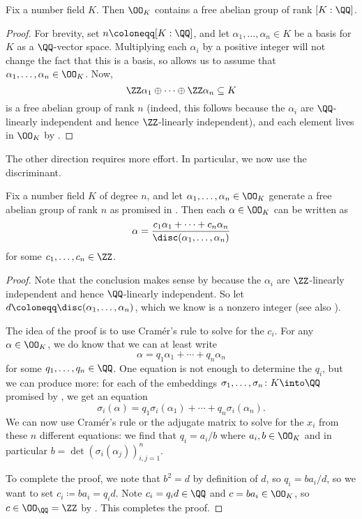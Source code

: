 \documentclass[../notes.tex]{subfiles}
\begin{document}
\begin{corollary} \label{cor:o-k-contains-rank-n}
	Fix a number field $K$. Then $\OO_K$ contains a free abelian group of rank $[K:\QQ]$.
\end{corollary}
\begin{proof}
	For brevity, set $n\coloneqq[K:\QQ]$, and let $\alpha_1,\ldots,\alpha_n\in K$ be a basis for $K$ as a $\QQ$-vector space. Multiplying each $\alpha_i$ by a positive integer will not change the fact that this is a basis, so  allows us to assume that $\alpha_1,\ldots,\alpha_n\in\OO_K$. Now,
	\[\ZZ\alpha_1\oplus\cdots\oplus\ZZ\alpha_n\subseteq K\]
	is a free abelian group of rank $n$ (indeed, this follows because the $\alpha_i$ are $\QQ$-linearly independent and hence $\ZZ$-linearly independent), and each element lives in $\OO_K$ by .
\end{proof}
The other direction requires more effort. In particular, we now use the discriminant.
\begin{lemma} \label{lem:bound-denom-o-k}
	Fix a number field $K$ of degree $n$, and let $\alpha_1,\ldots,\alpha_n\in\OO_K$ generate a free abelian group of rank $n$ as promised in . Then each $\alpha\in\OO_K$ can be written as
	\[\alpha=\frac{c_1\alpha_1+\cdots+c_n\alpha_n}{\disc(\alpha_1,\ldots,\alpha_n)}\]
	for some $c_1,\ldots,c_n\in\ZZ$.
\end{lemma}
\begin{proof}
	Note that the conclusion makes sense by  because the $\alpha_i$ are $\ZZ$-linearly independent and hence $\QQ$-linearly independent. So let $d\coloneqq\disc(\alpha_1,\ldots,\alpha_n)$, which we know is a nonzero integer (see also ).

	The idea of the proof is to use Cram\'er's rule to solve for the $c_i$. For any $\alpha\in\OO_K$, we do know that we can at least write
	\[\alpha=q_1\alpha_1+\cdots+q_n\alpha_n\]
	for some $q_1,\ldots,q_n\in\QQ$. One equation is not enough to determine the $q_i$, but we can produce more: for each of the embeddings $\sigma_1,\ldots,\sigma_n\colon K\into\QQ$ promised by , we get an equation
	\[\sigma_i(\alpha)=q_1\sigma_i(\alpha_1)+\cdots+q_n\sigma_i(\alpha_n).\]
	We can now use Cram\'er's rule or the adjugate matrix to solve for the $x_i$ from these $n$ different equations: we find that $q_i=a_i/b$ where $a_i,b\in\OO_K$ and in particular $b=\det(\sigma_i(\alpha_j))_{i,j=1}^n$.

	To complete the proof, we note that $b^2=d$ by definition of $d$, so $q_i=ba_i/d$, so we want to set $c_i\coloneqq ba_i=q_id$. Note $c_i=q_id\in\QQ$ and $c=ba_i\in\OO_K$, so $c\in\OO_\QQ=\ZZ$ by . This completes the proof.
\end{proof}
\end{document}
